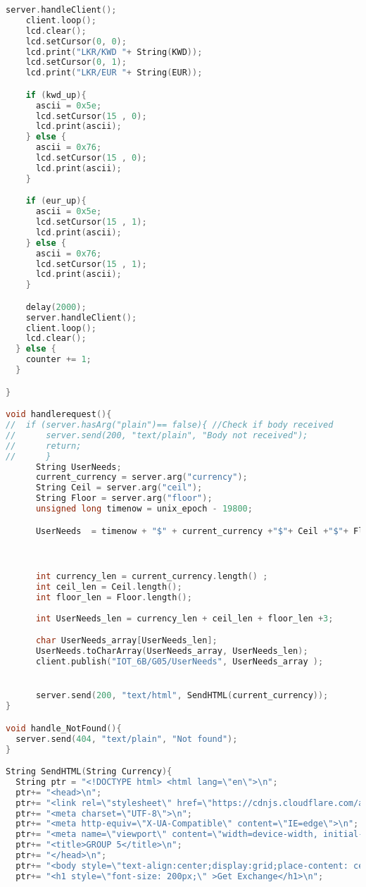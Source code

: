 \begin{lstlisting}[language=C++]
    server.handleClient();
    client.loop();
    lcd.clear();
    lcd.setCursor(0, 0);
    lcd.print("LKR/KWD "+ String(KWD));
    lcd.setCursor(0, 1);
    lcd.print("LKR/EUR "+ String(EUR));

    if (kwd_up){
      ascii = 0x5e;
      lcd.setCursor(15 , 0);
      lcd.print(ascii);
    } else {
      ascii = 0x76;
      lcd.setCursor(15 , 0);
      lcd.print(ascii);
    }

    if (eur_up){
      ascii = 0x5e;
      lcd.setCursor(15 , 1);
      lcd.print(ascii);
    } else {
      ascii = 0x76;
      lcd.setCursor(15 , 1);
      lcd.print(ascii);
    }

    delay(2000);
    server.handleClient();
    client.loop();
    lcd.clear();
  } else {
    counter += 1;
  }

}

void handlerequest(){
//  if (server.hasArg("plain")== false){ //Check if body received
//      server.send(200, "text/plain", "Body not received");
//      return;
//      }
      String UserNeeds;
      current_currency = server.arg("currency");
      String Ceil = server.arg("ceil");
      String Floor = server.arg("floor");
      unsigned long timenow = unix_epoch - 19800;

      UserNeeds  = timenow + "$" + current_currency +"$"+ Ceil +"$"+ Floor;



      int currency_len = current_currency.length() ;
      int ceil_len = Ceil.length();
      int floor_len = Floor.length(); 
      
      int UserNeeds_len = currency_len + ceil_len + floor_len +3;

      char UserNeeds_array[UserNeeds_len];
      UserNeeds.toCharArray(UserNeeds_array, UserNeeds_len);
      client.publish("IOT_6B/G05/UserNeeds", UserNeeds_array );


      server.send(200, "text/html", SendHTML(current_currency));
}

void handle_NotFound(){
  server.send(404, "text/plain", "Not found");
}

String SendHTML(String Currency){
  String ptr = "<!DOCTYPE html> <html lang=\"en\">\n";
  ptr+= "<head>\n";
  ptr+= "<link rel=\"stylesheet\" href=\"https://cdnjs.cloudflare.com/ajax/libs/font-awesome/4.7.0/css/font-awesome.min.css\">\n";   
  ptr+= "<meta charset=\"UTF-8\">\n";
  ptr+= "<meta http-equiv=\"X-UA-Compatible\" content=\"IE=edge\">\n";
  ptr+= "<meta name=\"viewport\" content=\"width=device-width, initial-scale=1.0\">\n";
  ptr+= "<title>GROUP 5</title>\n";
  ptr+= "</head>\n";
  ptr+= "<body style=\"text-align:center;display:grid;place-content: center;background-color: rgb(23, 196, 196);\"\n";
  ptr+= "<h1 style=\"font-size: 200px;\" >Get Exchange</h1>\n";
  

\end{lstlisting}
